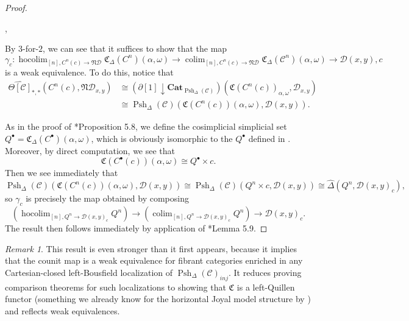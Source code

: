 \documentclass[a4paper]{article}
\numberwithin{equation}{subsection}
\theoremstyle{plain}   %
\theoremstyle{definition}
\theoremstyle{remark}
\newtheorem{rem}[equation]{Remark}
\theoremstyle{plain}
\DeclareMathOperator*{\coliml}{colim}
\newcommand{\Cat}{\ensuremath{\mathbf{Cat}}}
\newcommand{\overcat}[2]{{\left(#1\downarrow #2\right)}}
\DeclareMathOperator*{\hocoliml}{hocolim}
\newcommand{\psh}[1]{\ensuremath{\widehat{#1}}}
\providecommand{\C}{}
\renewcommand{\C}{\ensuremath{\mathcal{C}}}
\newcommand{\cellset}{\ensuremath{\widehat{\Theta[\mathcal{C}]}}}
\newcommand{\spsh}{\ensuremath{\operatorname{Psh}_\Delta(\mathcal{C})}}
\begin{document}
\begin{proof}
\begin{center}
,
	\end{center}
	By \(3\)-for-\(2\), we can see that it suffices to show that the map
	\[\gamma_c: \hocoliml_{[n],C^n(c)\to \mathfrak{N}\mathcal{D}} \mathfrak{C}_\Delta(C^n)(\alpha,\omega) \to \coliml_{[n],C^n(c)\to \mathfrak{N}\mathcal{D}} \mathfrak{C}_\Delta(\C^n)(\alpha,\omega)\to \mathcal{D}(x,y),c\]
	is a weak equivalence.
	To do this, notice that
	\begin{align*}
		\cellset_{\ast,\ast}(C^n(c), \mathfrak{N}\mathcal{D}_{x,y}) & \cong \overcat{\partial[1]}{\Cat_{\spsh}}(\mathfrak{C}(C^n(c))_{\alpha,\omega},\mathcal{D}_{x,y}) \\
		& \cong \spsh(\mathfrak{C}(C^n(c))(\alpha,\omega), \mathcal{D}(x,y)).
	\end{align*}

	As in the proof of \cite{ds2}*{Proposition 5.8}, we define the cosimplicial simplicial set \(Q^\bullet = \mathfrak{C}_\Delta (C^\bullet)(\alpha,\omega)\), which is obviously isomorphic to the \(Q^\bullet\) defined in \cite{ds2}. Moreover, by direct computation, we see that
	\[\mathfrak{C}(C^\bullet(c))(\alpha,\omega)\cong Q^\bullet \times c.\]
	Then we see immediately that
	\[\spsh(\mathfrak{C}(C^n(c))(\alpha,\omega), \mathcal{D}(x,y)) \cong \spsh(Q^n \times c, \mathcal{D}(x,y))\cong \psh{\Delta}(Q^n, \mathcal{D}(x,y)_c),\]
	so \(\gamma_c\) is precisely the map obtained by composing
	\[\left(\hocoliml_{[n],Q^n\to \mathcal{D}(x,y)_c} Q^n\right) \to \left(\coliml_{[n],Q^n\to \mathcal{D}(x,y)_c} Q^n\right) \to \mathcal{D}(x,y)_c.\]
	The result then follows immediately by application of \cite{ds2}*{Lemma 5.9}.
\end{proof}

\begin{rem}
	This result is even stronger than it first appears, because it implies that the counit map is a weak equivalence for fibrant categories enriched in any Cartesian-closed left-Bousfield localization of \(\spsh_{inj}\).  It reduces proving comparison theorems for such localizations to showing that \(\mathfrak{C}\) is a left-Quillen functor (something we already know for the horizontal Joyal model structure by ) and reflects weak equivalences.
\end{rem}
\end{document}
